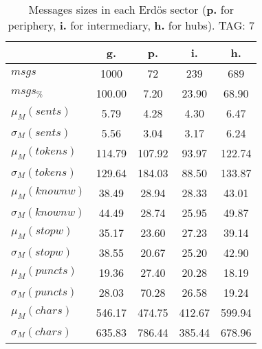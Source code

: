 \begin{table}[h!]
\begin{center}
\begin{tabular}{| l || c | c | c | c |}\hline
 & {\bf g.} & {\bf p.} & {\bf i.} & {\bf h.} \\\hline\hline
$msgs$ & 1000  & 72  & 239  & 689 \\
$msgs_{\%}$ & 100.00  & 7.20  & 23.90  & 68.90 \\\hline
$\mu_M(sents)$ & 5.79  & 4.28  & 4.30  & 6.47 \\
$\sigma_M(sents)$ & 5.56  & 3.04  & 3.17  & 6.24 \\\hline
$\mu_M(tokens)$ & 114.79  & 107.92  & 93.97  & 122.74 \\
$\sigma_M(tokens)$ & 129.64  & 184.03  & 88.50  & 133.87 \\\hline
$\mu_M(knownw)$ & 38.49  & 28.94  & 28.33  & 43.01 \\
$\sigma_M(knownw)$ & 44.49  & 28.74  & 25.95  & 49.87 \\\hline
$\mu_M(stopw)$ & 35.17  & 23.60  & 27.23  & 39.14 \\
$\sigma_M(stopw)$ & 38.55  & 20.67  & 25.20  & 42.90 \\\hline
$\mu_M(puncts)$ & 19.36  & 27.40  & 20.28  & 18.19 \\
$\sigma_M(puncts)$ & 28.03  & 70.28  & 26.58  & 19.24 \\\hline
$\mu_M(chars)$ & 546.17  & 474.75  & 412.67  & 599.94 \\
$\sigma_M(chars)$ & 635.83  & 786.44  & 385.44  & 678.96 \\\hline
\end{tabular}
\caption{Messages sizes in each Erd\"os sector ({{\bf p.}} for periphery, {{\bf i.}} for intermediary, {{\bf h.}} for hubs). TAG: 7}
\end{center}
\end{table}